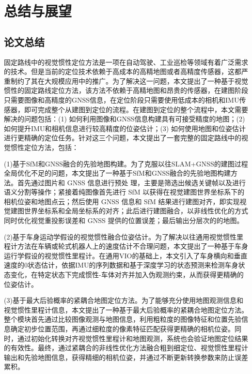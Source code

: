 \chapter{总结与展望}

\section{论文总结}

固定路线中的视觉惯性定位方法是一项在自动驾驶、工业巡检等领域有着广泛需求的技术。但是当前的定位技术依赖于高成本的高精地图或者高精度传感器，这都严重制约了其在大规模应用中的推广。为了解决这一问题，本文提出了一种基于视觉惯性的固定路线定位方法，该方法不依赖于高精地图和昂贵的传感器，在建图阶段只需要图像和高精度的GNSS信息，在定位阶段只需要使用低成本的相机和IMU传感器，即可完成整个从建图到定位的流程。在建图到定位的整个流程中，本文需要解决的问题包括：(1) 如何利用图像和GNSS信息构建具有可接受精度的地图；(2) 如何提升IMU和相机信息进行较高精度的位姿估计；(3) 如何使用地图和位姿估计进行更精确的定位任务。针对这三个问题，本文提出了一套完整的固定路线中的视觉惯性定位方法，包括：

(1)基于SfM和GNSS融合的先验地图构建。为了克服以往SLAM+GNSS的建图过程全局优化不足的问题，本文提出了一种基于SfM和GNSS融合的先验地图构建方法。首先通过图片和 GNSS 信息进行预处
理，主要是筛选出候选关键帧以及进行语义分割等操作；紧接着纯图像首先进行 SfM 以获得在视觉建图世界坐标系下的相机位姿和地图点云；然后使用 GNSS 信息和 SfM 结果进行建图对齐，即实现视觉建图世界坐标系和全局坐标系的对齐；此后进行建图融合，以非线性优化的方式同时优化视觉重投影误差和 GNSS 提供的位置误差；最后输出分层次的的地图。

(2)基于车身运动学假设的视觉惯性融合位姿估计。为了解决以往通用视觉惯性里程计方法在车辆或轮式机器人上的速度估计不合理问题，本文提出了一种基于车身运行学假设的视觉惯性里程计。在通用VIO的基础上，本文引入了车身横向和垂直速度的0状态估计，依据IMU的序列数据和基于深度学习的状态预测来检测车身状态变化，在特定状态下完成惯性-车体对齐并加入伪观测约束，从而获得更精确的位姿估计。

(3)基于最大后验概率的紧耦合地图定位方法。为了能够充分使用地图观测信息和视觉惯性里程计信息，本文提出了一种基于最大后验概率的紧耦合地图定位方法。整个模块首先通过比较图像观测与地图信息，利用粗粒度的图像特征和位置先验信息确定初步位置范围，再通过细粒度的像素特征匹配获得更精确的相机位姿。同时，通过初始化转换对齐视觉惯性里程计和地图观测，系统也会验证地图定位结果的有效性。最终，通过紧耦合的非线性优化方法融合粗到细定位、视觉惯性里程计输出和先验地图信息，获得精细的相机位姿，并通过不断更新转换参数来防止误差累积。


